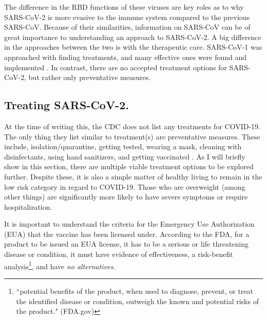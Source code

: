 \documentclass[10pt, a4paper, twocolumn]{book}
\begin{document}
The difference in the RBD functions of these viruses are key roles as to why SARS-CoV-2 is more evasive to the immune system compared to the previous SARS-CoV. Because of their similarities, information on SARS-CoV can be of great importance to understanding an approach to SARS-CoV-2. A big difference in the approaches between the two is with the therapeutic care. SARS-CoV-1 was approached with finding treatments, and many effective ones were found and implemented \citep{SARSvsSARS}. In contrast, there are no accepted treatment options for SARS-CoV-2, but rather only preventative measures.




























\subsection{Treating SARS-CoV-2.}

At the time of writing this, the CDC does not list any treatments for COVID-19. The only thing they list similar to treatment(s) are preventative measures. These include, isolation/quarantine, getting tested, wearing a mask, cleaning with disinfectants, using hand sanitizers, and getting vaccinated \citep{CDCIfYouAreSick}. As I will briefly show in this section, there are multiple viable treatment options to be explored further. Despite these, it is also a simple matter of healthy living to remain in the low risk category in regard to COVID-19. Those who are overweight (among other things) are significantly more likely to have severe symptoms or require hospitalization.

It is important to understand the criteria for the Emergency Use Authorization (EUA) that the vaccine has been licensed under. According to the FDA, for a product to be issued an EUA license, it has to be a serious or life threatening disease or condition, it must have evidence of effectiveness, a risk-benefit analysis\footnote{``potential benefits of the product, when used to diagnose, prevent, or treat the identified disease or condition, outweigh the known and potential risks of the product." (FDA.gov)}, and have \textit{no alternatives}.
\end{document}
